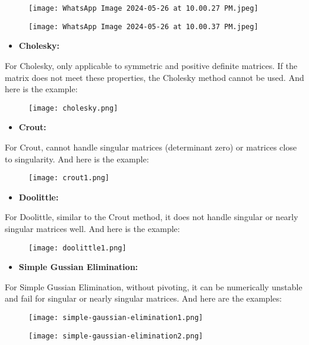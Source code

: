 \documentclass{uofa-eng-assignment}
\begin{document}
    \begin{figure}[H]
        \centering
        \texttt{[image: WhatsApp Image 2024-05-26 at 10.00.27 PM.jpeg]}
    \end{figure}
\begin{figure}[H]
    \centering
    \texttt{[image: WhatsApp Image 2024-05-26 at 10.00.37 PM.jpeg]}

\end{figure}
\begin{itemize}
    \item \textbf{Cholesky:}
\end{itemize}
For Cholesky, only applicable to symmetric and positive definite matrices. If the matrix does not meet these properties, the Cholesky method cannot be used. And here is the example:
\begin{figure}[H]
    \centering
    \texttt{[image: cholesky.png]}
   
\end{figure}
\begin{itemize}
    \item \textbf{Crout:}
\end{itemize}
For Crout, cannot handle singular matrices (determinant zero) or matrices close to singularity. And here is the example:
\begin{figure}[H]
    \centering
    \texttt{[image: crout1.png]}
\end{figure}
\begin{itemize}
    \item \textbf{Doolittle:}
\end{itemize}
For Doolittle, similar to the Crout method, it does not handle singular or nearly singular matrices well. And here is the example:
\begin{figure}[H]
    \centering
    \texttt{[image: doolittle1.png]}
\end{figure}
\begin{itemize}
    \item \textbf{Simple Gussian Elimination:}
\end{itemize}
For Simple Gussian Elimination, without pivoting, it can be numerically unstable and fail for singular or nearly singular matrices. And here are the examples:
\begin{figure}[H]
    \centering
    \texttt{[image: simple-gaussian-elimination1.png]}
\end{figure}
\begin{figure}[H]
    \centering
    \texttt{[image: simple-gaussian-elimination2.png]}
\end{figure}
\end{document}
